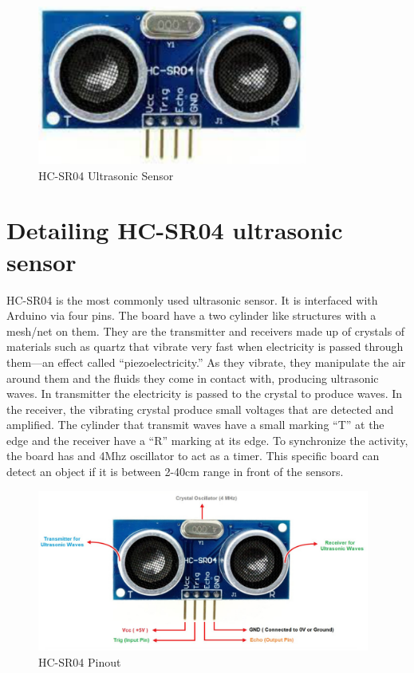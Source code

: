 \begin{figure}
    \centering
    \includegraphics[width=3.5in]{Images/Ultrasonic/board.png}
    \caption{HC-SR04 Ultrasonic Sensor}
\end{figure}

\section{Detailing HC-SR04 ultrasonic sensor}

\par HC-SR04 is the most commonly used ultrasonic sensor. It is interfaced with Arduino via four pins. The board have a two cylinder like structures with a mesh/net on them. They are the transmitter and receivers made up of crystals of materials such as quartz that vibrate very fast when electricity is passed through them—an effect called “piezoelectricity.” As they vibrate, they manipulate the air around them and the fluids they come in contact with, producing ultrasonic waves. In transmitter the electricity is passed to the crystal to produce waves. In the receiver, the vibrating crystal produce small voltages that are detected and amplified. The cylinder that transmit waves have a small marking “T” at the edge and the receiver have a “R” marking at its edge. To synchronize the activity, the board has and 4Mhz oscillator to act as a timer. This specific board can detect an object if it is between 2-40cm range in front of the sensors.

\begin{figure}
	\centering
	\includegraphics[width=4.3in]{Images/Ultrasonic/pinout.png}
	\caption{HC-SR04 Pinout}
\end{figure}

